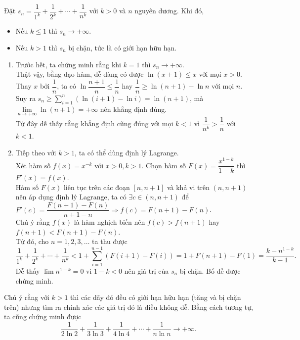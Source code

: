 \begin{bode}
	Đặt $s_n=\dfrac{1}{1^k}+\dfrac{1}{2^k}+\cdots+\dfrac{1}{n^k}$ với $k>0$ và $n$ nguyên dương. Khi đó,
	\begin{itemize}
		\item Nếu $k\le 1$ thì $s_n\to +\infty$.
		\item Nếu $k>1$ thì $s_n$ bị chặn, tức là có giới hạn hữu hạn.
	\end{itemize}
	\begin{cm}
		\begin{enumerate}
			\item Trước hết, ta chứng minh rằng khi $k=1$ thì $s_n\to +\infty$.\\
			Thật vậy, bằng đạo hàm, dễ dàng có được $\ln(x+1)\le x$ với mọi $x>0$.\\
			Thay $x$ bởi $\dfrac{1}{n}$, ta có $\ln\dfrac{n+1}{n}\le \dfrac{1}{n}$ hay $\dfrac{1}{n}\ge \ln(n+1)-\ln n$ với mọi $n$.\\ 
			Suy ra $\displaystyle s_n\ge \sum_{i=1}^{n} \left(\ln(i+1)-\ln i \right)=\ln(n+1)$, mà $\lim\limits_{n\to +\infty}\ln(n+1)=+\infty$ nên khẳng định đúng.\\
			Từ đây dễ thấy rằng khẳng định cũng đúng với mọi $k<1$ vì $\dfrac{1}{n^k}>\dfrac{1}{n}$ với $k<1$.
			\item Tiếp theo với $k>1$, ta có thể dùng định lý Lagrange.\\
			Xét hàm số $f(x)=x^{-k}$ với $x>0,k>1$. Chọn hàm số $F(x)=\dfrac{x^{1-k}}{1-k}$ thì $F'(x)=f(x)$.\\
			Hàm số $F(x)$ liên tục trên các đoạn $[n,n+1]$ và khả vi trên $(n,n+1)$ nên áp dụng định lý Lagrange, ta có $\exists c\in (n,n+1)$ để $F'(c)=\dfrac{F(n+1)-F(n)}{n+1-n}\Rightarrow f(c)=F(n+1)-F(n)$.\\
			Chú ý rằng $f(x)$ là hàm nghịch biến nên $f(c)>f(n+1)$ hay $f(n+1)<F(n+1)-F(n)$.\\
			Từ đó, cho $n=1,2,3,\ldots$ ta thu được \[\dfrac{1}{1^k}+\dfrac{1}{2^k}+\cdots+\dfrac{1}{n^k}<1+\sum_{i=1}^{n-1}\left(F(i+1)-F(i)\right)=1+F(n+1)-F(1)=\dfrac{k-n^{1-k}}{k-1}.\]
			Dễ thấy $\lim n^{1-k}=0$ vì $1-k<0$ nên giá trị của $s_n$ bị chặn. Bổ đề được chứng minh.
		\end{enumerate}
	\end{cm}
	\begin{nx}		
		Chú ý rằng với $k>1$ thì các dãy đó đều có giới hạn hữu hạn (tăng và bị chặn trên) nhưng tìm ra chính xác các giá trị đó là điều không dễ. Bằng cách tương tự, ta cũng chứng minh được
		\[\dfrac{1}{2\ln 2}+\dfrac{1}{3\ln 3}+\dfrac{1}{4\ln 4}+\cdots+\dfrac{1}{n\ln n}\to +\infty.\]
	\end{nx}
\end{bode}

